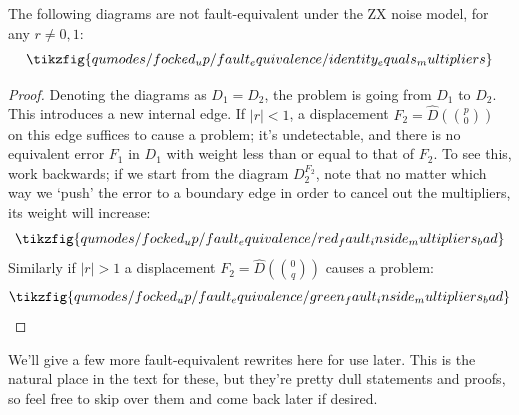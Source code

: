 \begin{proposition}
    The following diagrams are not fault-equivalent under the ZX noise model, for any $r \neq 0, 1$:
    \begin{equation}
        \tikzfig{qumodes/focked_up/fault_equivalence/identity_equals_multipliers}
    \end{equation}
    \begin{proof}
        Denoting the diagrams as $D_1 = D_2$, the problem is going from $D_1$ to $D_2$.
        This introduces a new internal edge.
        If $|r| < 1$, a displacement $F_2 = \hat{D}(\binom{p}{0})$ on this edge suffices to cause a problem; it's undetectable, and there is no equivalent error $F_1$ in $D_1$ with weight less than or equal to that of $F_2$.
        To see this, work backwards; if we start from the diagram $D_2^{F_2}$, note that no matter which way we `push' the error to a boundary edge in order to cancel out the multipliers, its weight will increase:
        \begin{equation}
            \tikzfig{qumodes/focked_up/fault_equivalence/red_fault_inside_multipliers_bad}
        \end{equation}
        Similarly if $|r| > 1$ a displacement $F_2 = \hat{D}(\binom{0}{q})$ causes a problem:
        \begin{equation}
            \tikzfig{qumodes/focked_up/fault_equivalence/green_fault_inside_multipliers_bad}
        \end{equation}
    \end{proof}
\end{proposition}

We'll give a few more fault-equivalent rewrites here for use later.
This is the natural place in the text for these, but they're pretty dull statements and proofs, so feel free to skip over them and come back later if desired.

